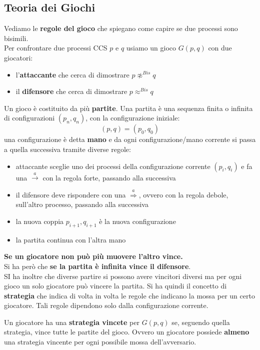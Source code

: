 \subsection{Teoria dei Giochi}
Vediamo le \textbf{regole del gioco} che spiegano come capire se due processi
sono bisimili. \\
Per confrontare due processi CCS $p$ e $q$ usiamo un gioco $G(p, q)$ con due
giocatori: 
\begin{itemize}
  \item l'\textbf{attaccante} che cerca di dimostrare $p\not\approx^{Bis}q$
  \item il \textbf{difensore }che cerca di dimostrare $p\approx^{Bis}q$
\end{itemize}
Un gioco è costituito da più \textbf{partite}.
Una partita è una sequenza finita o infinita di configurazioni $(p_n, q_n)$, con
la configurazione iniziale:
\[(p, q)=(p_0, q_0)\]
una configurazione è detta \textbf{mano} e da ogni configurazione/mano corrente
si passa a quella successiva tramite diverse regole:
\begin{itemize}
  \item attaccante sceglie uno dei processi della configurazione corrente
  $(p_i, q_i)$ e fa una $\stackrel{a}{\rightarrow}$ con la regola forte, passando
  alla successiva
  \item il difensore deve rispondere con una $\stackrel{a}{\Rightarrow}$, ovvero
  con la regola debole, sull'altro processo, passando alla successiva
  \item la nuova coppia $p_{i+1}, q_{i+1}$ è la nuova configurazione
  \item la partita continua con l'altra mano
\end{itemize}
\textbf{Se un giocatore non può più muovere l'altro vince.}\\
Si ha però che \textbf{se la partita è infinita vince il difensore}.\\
SI ha inoltre che diverse partire si possono avere vincitori diversi ma per ogni
gioco un solo giocatore può vincere la partita. Si ha quindi il concetto di
\textbf{strategia} che indica di volta in volta le regole che indicano la mossa
per un certo giocatore. Tali regole dipendono solo dalla configurazione
corrente.\\
\begin{definizione}
Un giocatore ha una \textbf{strategia vincete} per $G(p, q)$ se, seguendo quella
strategia, vince tutte le partite del gioco. Ovvero un giocatore possiede \textbf{almeno} una strategia vincente per ogni possibile mossa dell'avversario.
\end{definizione} \vspace{5mm} %
